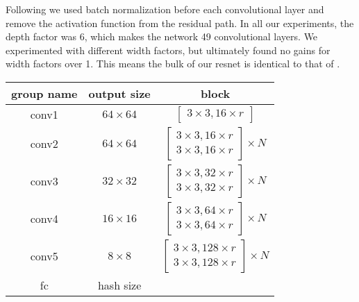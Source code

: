 \documentclass{article}
\renewenvironment{table}{\par\medskip\noindent\minipage{\linewidth}}{\endminipage\par\medskip}
\begin{document}
\begin{multicols}{2}
Following \cite{He2016IdentityMI} we used batch normalization before each convolutional layer and remove the activation function from the residual path.
In all our experiments, the depth factor was 6, which makes the network 49 convolutional layers.
We experimented with different width factors, but ultimately found no gains for width factors over 1.
This means the bulk of our resnet is identical to that of \cite{He2016DeepRL}.


\begin{table}
\label{logonetplus}
\begin{small}\begin{sc}\begin{center}
\begin{tabular}{|c|c|c|}
  \hline			
  group name & output size & block \\ \hline
  conv1 & $64 \times 64$ & $\begin{bmatrix}3\times3,16 \times r \end{bmatrix}$ \\ \hline
  conv2 & $64 \times 64$ &  $\begin{bmatrix}3\times3,16\times r \\ 3\times 3,16\times r\end{bmatrix}\times N$ \\ \hline
  conv3 & $32 \times 32$ &  $\begin{bmatrix}3\times3,32\times r \\ 3\times 3,32\times r\end{bmatrix}\times N$ \\ \hline
  conv4 & $16 \times 16$ &  $\begin{bmatrix}3\times3,64\times r \\ 3\times 3,64\times r\end{bmatrix}\times N$ \\ \hline
  conv5 & $8 \times 8$ &  $\begin{bmatrix}3\times3,128\times r \\ 3\times 3,128\times r\end{bmatrix}\times N$ \\ \hline
      fc    & hash size & \\ \hline  
\end{tabular}
\end{center}\end{sc}\end{small}
\end{table}


\end{multicols}
\end{document}
